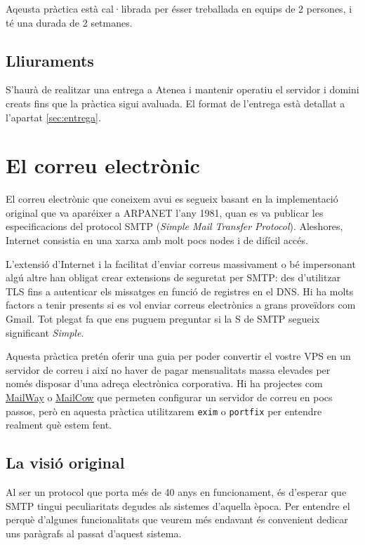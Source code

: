 \documentclass{practicaitic}
\begin{document}
Aqeusta pràctica està cal·librada per ésser treballada en equips de 2 persones,
i té una durada de 2 setmanes.

\subsection{Lliuraments}

S'haurà de realitzar una entrega a Atenea i mantenir operatiu el servidor 
i domini creats fins que la pràctica sigui avaluada. El format de l'entrega
està detallat a l'apartat \ref{sec:entrega}.

\section{El correu electrònic}

El correu electrònic que coneixem avui es segueix basant en la
implementació original que va aparéixer a ARPANET l'any
1981, quan es va publicar les especificacions del protocol SMTP
(\textit{Simple Mail Transfer Protocol}). Aleshores, Internet consistia
en una xarxa amb molt pocs nodes i de difícil accés.

L'extensió d'Internet i la facilitat d'enviar correus massivament o bé
impersonant algú altre han obligat crear extensions de seguretat per
SMTP: des d'utilitzar TLS fins a autenticar els missatges en funció
de registres en el DNS. Hi ha molts factors a tenir presents si
es vol enviar correus electrònics a grans proveïdors com Gmail.
Tot plegat fa que ens puguem preguntar si la S de SMTP segueix
significant \textit{Simple}. %

Aquesta pràctica pretén oferir una guia per poder convertir el vostre
VPS en un servidor de correu i així no haver de pagar mensualitats 
massa elevades per només disposar d'una adreça electrònica corporativa.
Hi ha projectes com \href{https://docs.mailway.app/self-host/}{MailWay} o 
\href{https://docs.mailcow.email}{MailCow} que permeten configurar un
servidor de correu en pocs passos, però en aquesta pràctica utilitzarem
\texttt{exim} o \texttt{portfix} per entendre realment què estem fent.

\subsection{La visió original}

Al ser un protocol que porta més de 40 anys en funcionament, és d'esperar
que SMTP tingui peculiaritats degudes als sistemes d'aquella època. Per
entendre el perquè d'algunes funcionalitats que veurem més endavant és
convenient dedicar uns paràgrafs al passat d'aquest sistema.
\end{document}
